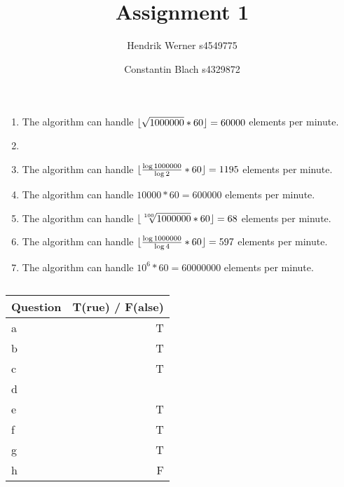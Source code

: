 \documentclass[12pt]{article}
\title {Assignment 1}
\author {
	Hendrik Werner s4549775
	\and Constantin Blach s4329872
}
\DeclarePairedDelimiter\floor{\lfloor}{\rfloor}
\begin{document}
\maketitle

\section{} %
\subsection{} %
\begin{enumerate}[a]
	\item %
	The algorithm can handle $\floor{\sqrt{1000000} * 60} = 60000$ elements per minute.

	\item %
	\item %
	The algorithm can handle $\floor{\frac{\log{1000000}}{\log{2}} * 60} = 1195$ elements per minute.

	\item %
	The algorithm can handle $10000 * 60 = 600000$ elements per minute.

	\item %
	The algorithm can handle $\floor{\sqrt[100]{1000000} * 60} = 68$ elements per minute.

	\item %
	The algorithm can handle $\floor{\frac{\log{1000000}}{\log{4}} * 60} = 597$ elements per minute.

	\item %
	The algorithm can handle $10^6 * 60 = 60000000$ elements per minute.
\end{enumerate}

\subsection{} %
\begin{tabular}{|l|r|}
	\hline
	Question & T(rue) / F(alse) \\
	\hline
	a & T\\
	b & T\\
	c & T\\
	d & \\
	e & T\\
	f & T\\
	g & T\\
	h & F\\
	\hline
\end{tabular}
\end{document}
